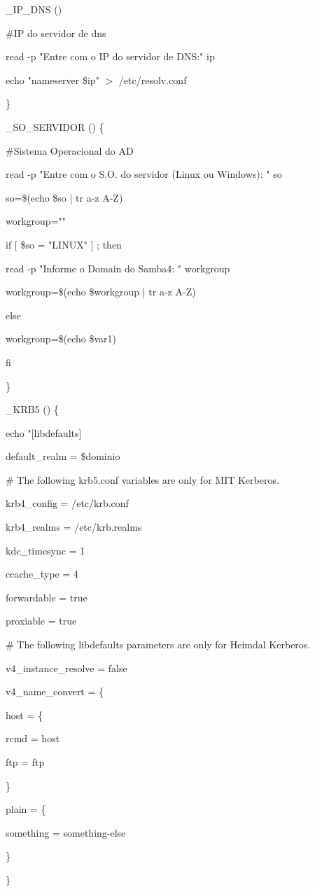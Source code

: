 \_IP\_DNS (){

	\#IP do servidor de dns

	read -p "Entre com o IP do servidor de DNS:" ip

	echo "nameserver \$ip" $>$ /etc/resolv.conf

\}

\_SO\_SERVIDOR () \{

	\#Sistema Operacional do AD	

	read -p "Entre com o S.O. do servidor (Linux ou Windows): " so

	so=\$(echo \$so | tr a-z A-Z)

	workgroup=""

	if [ \$so = "LINUX" ] ; then

		read -p "Informe o Domain do Samba4: " workgroup

		workgroup=\$(echo \$workgroup | tr a-z A-Z)

	else

		workgroup=\$(echo \$var1)

	fi

\}

\_KRB5 () \{

   echo "[libdefaults]

   default\_realm = \$dominio

	 \# The following krb5.conf variables are only for MIT Kerberos.

      krb4\_config = /etc/krb.conf

      krb4\_realms = /etc/krb.realms

      kdc\_timesync = 1

      ccache\_type = 4

      forwardable = true

      proxiable = true

		\# The following libdefaults parameters are only for Heimdal Kerberos.

      v4\_instance\_resolve = false

      v4\_name\_convert = \{

           host = \{

               rcmd = host

               ftp = ftp

           \}  

           plain = \{

               something = something-else

           \}  

      \}  

}
